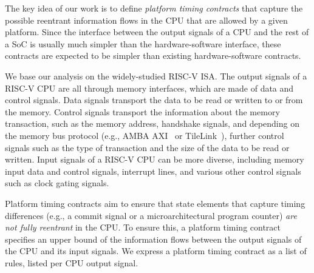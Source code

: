 The key idea of our work is to define \emph{platform timing contracts} that capture the possible reentrant information flows in the CPU that are allowed by a given platform.
Since the interface between the output signals of a CPU and the rest of a SoC is usually much simpler than the hardware-software interface, these contracts are expected to be simpler than existing hardware-software contracts.

We base our analysis on the widely-studied RISC-V ISA.
The output signals of a RISC-V CPU are all through memory interfaces, which are made of data and control signals.
Data signals transport the data to be read or written to or from the memory.
Control signals transport the information about the memory transaction, such as the memory address, handshake signals, and depending on the memory bus protocol (e.g., AMBA AXI~\cite{arm_amba} or TileLink~\cite{tilelink_spec}), further control signals such as the type of transaction and the size of the data to be read or written.
Input signals of a RISC-V CPU can be more diverse, including memory input data and control signals, interrupt lines, and various other control signals such as clock gating signals.

Platform timing contracts aim to ensure that state elements that capture timing differences (e.g., a commit signal or a microarchitectural program counter) \emph{are not fully reentrant} in the CPU.
To ensure this, a platform timing contract specifies an upper bound of the information flows between the output signals of the CPU and its input signals.
We express a platform timing contract as a list of rules, listed per CPU output signal.


